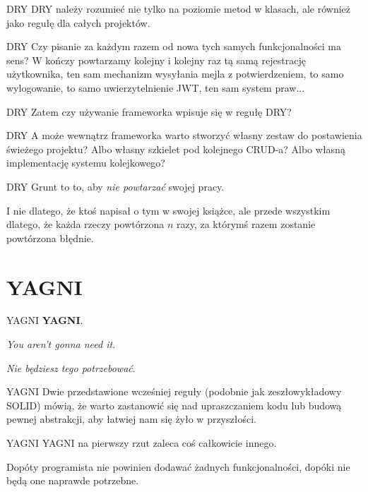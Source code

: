 \begin{frame}{DRY}
	DRY należy rozumieć nie tylko na poziomie metod w klasach, ale również jako regułę dla całych projektów.
\end{frame}

\begin{frame}{DRY}
	Czy pisanie za każdym razem od nowa tych samych funkcjonalności ma sens? W kończy powtarzamy kolejny i kolejny raz tą samą rejestrację użytkownika, ten sam mechanizm wysyłania mejla z potwierdzeniem, to samo wylogowanie, to samo uwierzytelnienie JWT, ten sam system praw...
\end{frame}

\begin{frame}{DRY}
	Zatem czy używanie frameworka wpisuje się w regułę DRY?
\end{frame}

\begin{frame}{DRY}
	A może wewnątrz frameworka warto stworzyć własny zestaw do postawienia świeżego projektu? Albo własny szkielet pod kolejnego CRUD-a? Albo własną implementację systemu kolejkowego?
\end{frame}

\begin{frame}{DRY}
	Grunt to to, aby \emph{nie powtarzać} swojej pracy.
	
	I nie dlatego, że ktoś napisał o tym w swojej książce, ale przede wszystkim dlatego, że każda rzeczy powtórzona $n$ razy, za którymś razem zostanie powtórzona błędnie.
\end{frame}

\section{YAGNI}

\begin{frame}{YAGNI}
	\textbf{YAGNI}.
	
	\emph{You aren't gonna need it}.
	
	\emph{Nie będziesz tego potrzebować}.
\end{frame}

\begin{frame}{YAGNI}
	Dwie przedstawione wcześniej reguły (podobnie jak zeszłowykładowy SOLID) mówią, że warto zastanowić się nad upraszczaniem kodu lub budową pewnej abstrakcji, aby łatwiej nam się żyło w przyszłości.
\end{frame}

\begin{frame}{YAGNI}
	YAGNI na pierwszy rzut zaleca coś całkowicie innego.
	
	Dopóty programista nie powinien dodawać żadnych funkcjonalności, dopóki nie będą one naprawde potrzebne.
\end{frame}

